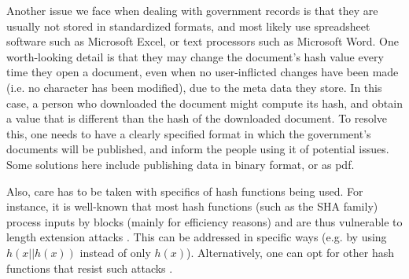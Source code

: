 Another issue we face when dealing with government records is that they are usually not stored in standardized formats, and most likely use spreadsheet software such as Microsoft Excel, or text processors such as Microsoft Word. One worth-looking detail is that they may change the document's hash value every time they open a document, even when no user-inflicted changes have been made (i.e. no character has been modified), due to the meta data they store. In this case, a person who downloaded the document might compute its hash, and obtain a value that is different than the hash of the downloaded document. To resolve this, one needs to have a clearly specified format in which the government's documents will be published, and inform the people using it of potential issues. Some solutions here include publishing data in binary format, or as pdf.

Also, care has to be taken with specifics of hash functions being used. For instance, it is well-known that most hash functions (such as the SHA family) process inputs by blocks (mainly for efficiency reasons) and are thus vulnerable to length extension attacks \cite{lengthextension}. This can be addressed in specific ways (e.g. by using $h(x||h(x))$ instead of only $h(x)$). Alternatively, one can opt for other hash functions that resist such attacks \cite{keccak}.



